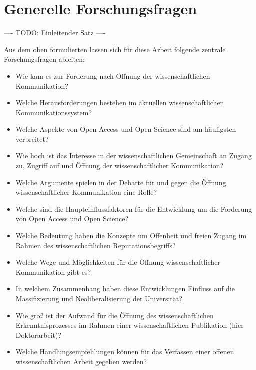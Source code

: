 \section{Generelle Forschungsfragen}

---- TODO: Einleitender Satz ----

Aus dem oben formulierten lassen sich für diese Arbeit folgende zentrale Forschungsfragen ableiten:
\begin{itemize}
\item Wie kam es zur Forderung nach Öffnung der wissenschaftlichen Kommunikation?
\item Welche Herausforderungen bestehen im aktuellen wissenschaftlichen Kommunikationssystem?
\item Welche Aspekte von Open Access und Open Science sind am häufigsten verbreitet?
\item Wie hoch ist das Interesse in der wissenschaftlichen Gemeinschaft an Zugang zu, Zugriff auf und Öffnung der wissenschaftlicher Kommunikation?
\item Welche Argumente spielen in der Debatte für und gegen die Öffnung wissenschaftlicher Kommunikation eine Rolle?
\item Welche sind die Haupteinflussfaktoren für die Entwicklung um die Forderung von Open Access und Open Science?
\item Welche Bedeutung haben die Konzepte um Offenheit und freien Zugang im Rahmen des wissenschaftlichen Reputationsbegriffs?
\item Welche Wege und Möglichkeiten für die Öffnung wissenschaftlicher Kommunikation gibt es?
\item In welchem Zusammenhang haben diese Entwicklungen Einfluss auf die Massifizierung und Neoliberalisierung der Universität?
\item Wie groß ist der Aufwand für die Öffnung des wissenschaftlichen Erkenntnisprozesses im Rahmen einer wissenschaftlichen Publikation (hier Doktorarbeit)?
\item Welche Handlungsempfehlungen können für das Verfassen einer offenen wissenschaftlichen Arbeit gegeben werden?
\end{itemize}

